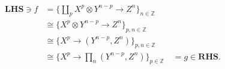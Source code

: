 \documentclass[preview]{standalone}
\begin{document}
\begin{align*}
\mathbf{LHS} \ni f & = \{\coprod_p X^p \otimes Y^{n-p} \to Z^n\}_{n \in \mathbb Z}\\
& \cong \{X^p \otimes Y^{n-p} \to Z^n\}_{p, n \in\mathbb Z}\\
& \cong \{X^p \to (Y^{n-p} , Z^n)\}_{p, n \in\mathbb Z}\\
& \cong \{X^p \to \prod_n (Y^{n-p} , Z^n)\}_{p \in\mathbb Z}\quad = g \in\mathbf{RHS}.
\end{align*}
\end{document}
